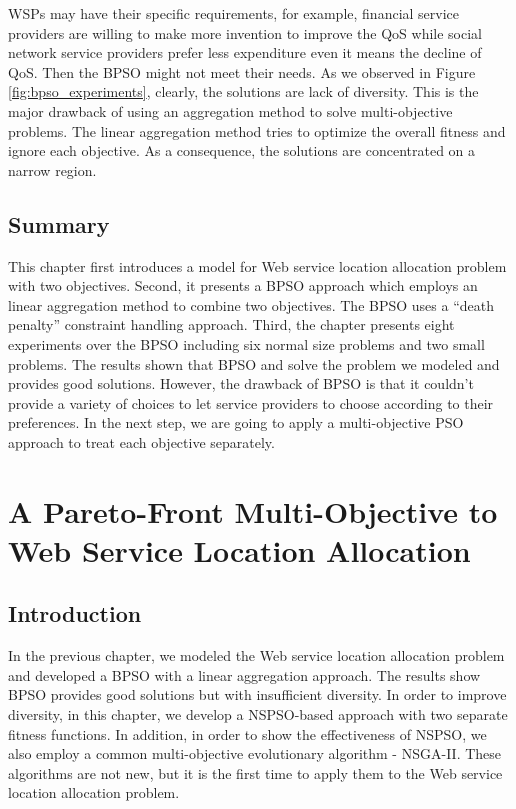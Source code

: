WSPs may have their specific requirements, for example, financial service providers are willing to make more invention to improve the QoS while social network 
service providers prefer less expenditure even it means the decline of QoS. 
Then the BPSO might not meet their needs. As we observed in Figure \ref{fig:bpso_experiments},
clearly, the solutions are lack of diversity. 
This is the major drawback of using an aggregation method to solve multi-objective problems. The linear
aggregation method tries to optimize the overall fitness and ignore each objective. As a consequence, the 
solutions are concentrated on a narrow region.


\section{Summary} 
This chapter first introduces a model for Web service location allocation problem with two objectives.
Second, it presents a BPSO approach which employs an linear aggregation method to combine two objectives. 
The BPSO uses a ``death penalty'' constraint handling approach. Third, the chapter presents eight experiments over the BPSO  including six normal size problems and two small problems. 
The results shown that BPSO and solve the problem we modeled and provides good 
solutions. However, the drawback of BPSO is that it couldn't provide a variety of choices to let service providers to choose according to their preferences. 
In the next step, we are going to apply a multi-objective PSO approach to treat each objective separately.


\chapter{A Pareto-Front Multi-Objective to Web Service Location Allocation}
\label{C:multi}
\section{Introduction}
In the previous chapter, we modeled the Web service location allocation problem and developed a BPSO with a linear aggregation approach.
The results show BPSO provides good solutions but with insufficient diversity. In order to improve diversity, 
in this chapter, we develop a NSPSO-based approach with two separate fitness functions. 
In addition, in order to show the effectiveness of NSPSO, we also employ a common multi-objective evolutionary algorithm - NSGA-II.
These algorithms are not new, but it is the first time to apply them to the Web service location allocation problem.

